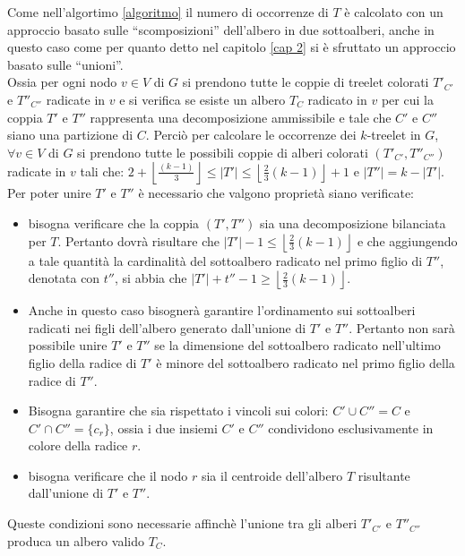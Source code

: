 Come nell'algortimo \ref{algoritmo} il numero di occorrenze di $ T $ è calcolato con un approccio basato sulle ``scomposizioni'' dell'albero in due sottoalberi,  anche in questo caso come per quanto detto nel capitolo \ref{cap 2} si è sfruttato un approccio basato sulle ``unioni''.\\
Ossia per ogni nodo $ v\in V $ di $ G $ si prendono tutte le coppie di treelet colorati $ T'_{C'} $ e $ T''_{C''} $ radicate in $ v $ e si verifica se esiste un albero $ T_C $ radicato in $ v $ per cui la coppia $ T' $ e $ T'' $ rappresenta una decomposizione ammissibile e tale che $ C' $ e $ C'' $ siano una partizione di $ C $. 
Perci\`o per calcolare le occorrenze dei $ k $-treelet in $ G $, $ \forall v \in V $ di $ G $ si prendono tutte le possibili coppie di alberi colorati $ (T'_{C'}, T''_{C''} )$ radicate in $ v $ tali che: $ 2+ \left\lfloor \frac{(k-1)}{3}  \right\rfloor \le |T'| \le \left\lfloor \frac{2}{3}(k-1) \right\rfloor  +1 $ e $ |T''| = k-|T'| $.
Per poter unire $T'$ e $T''$ è necessario che valgono proprietà siano verificate: 
\begin{itemize}
	\label{prova}
	\item bisogna verificare che la coppia $ (T',T'') $ sia una decomposizione bilanciata per $ T $.
	Pertanto dovr\`a risultare che $ |T'| - 1 \le \left\lfloor\frac{2}{3}(k-1)\right\rfloor $ e che aggiungendo a tale quantit\`a la cardinalit\`a del sottoalbero radicato nel primo figlio di $ T'' $, denotata con $ t'' $, si abbia che $ |T'| + t'' - 1 \ge \left\lfloor\frac{2}{3}(k-1)\right\rfloor $.
	\item Anche in questo caso bisogner\`a garantire l'ordinamento sui sottoalberi radicati nei figli dell'albero generato dall'unione di $ T' $ e $ T'' $.
	Pertanto non sar\`a possibile unire $ T' $ e $ T'' $ se la dimensione del sottoalbero radicato nell'ultimo figlio della radice di $ T' $ \`e minore del sottoalbero radicato nel primo figlio della radice di $ T'' $.
	\item Bisogna garantire che sia rispettato i vincoli sui colori: $C' \cup C'' = C$ e $ C' \cap C'' = \{c_r\}$, ossia i due insiemi $C'$ e $C''$ condividono esclusivamente in colore della radice $ r $.
	\item bisogna verificare che il nodo $ r $ sia il centroide dell'albero $ T $ risultante dall'unione di $ T' $ e $ T'' $. 
\end{itemize}
Queste condizioni sono necessarie affinch\`e l'unione tra gli alberi $ T'_{C'} $ e $ T''_{C''} $ produca un albero valido $ T_C $.

